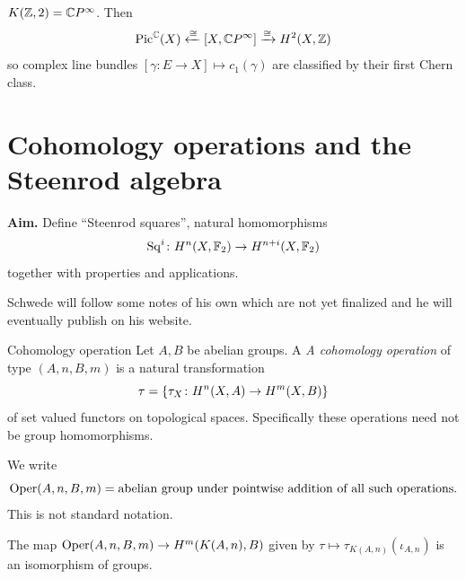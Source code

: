 \documentclass[language=english]{TemplateLecture}
\begin{document}
\begin{example}
    \(K(\mathbb{Z}, 2) = \mathbb{C} P^\infty\). Then
    \[\mathrm{Pic}^{\mathbb{C}}(X)\xleftarrow{\cong} [X, \mathbb{C} P^\infty] \xrightarrow{\cong} H^2(X,\mathbb{Z})\]
    so complex line bundles \([\gamma\colon E\to X] \mapsto c_1(\gamma)\) are classified by their first Chern class.
\end{example}

\section{Cohomology operations and the Steenrod algebra}

\textbf{Aim.} Define \enquote{Steenrod squares}, natural homomorphisms
\[\mathrm{Sq}^i\colon H^n(X, \mathbb{F}_2) \to H^{n+i}(X, \mathbb{F}_2)\]
together with properties and applications.

Schwede will follow some notes of his own which are not yet finalized and he will eventually publish on his website.

\begin{defi}{Cohomology operation}{}
    Let \(A,B\) be abelian groups. A \emph{A cohomology operation} of type \((A,n,B,m)\) is a natural transformation
    \[\tau = \{\tau_X\colon H^n(X,A)\to H^m(X,B)\}\]
    of set valued functors on topological spaces. Specifically these operations need not be group homomorphisms.

    We write
    \[\mathrm{Oper}(A,n,B,m) = \text{abelian group under pointwise addition of all such operations}.\]
    This is not standard notation.
\end{defi}

\begin{lem}{}{}
    The map \(\mathrm{Oper}(A,n,B,m)\to H^m(K(A,n), B)\) given by \(\tau\mapsto \tau_{K(A,n)}(\iota_{A,n})\) is an isomorphism of groups.
\end{lem}
\end{document}
